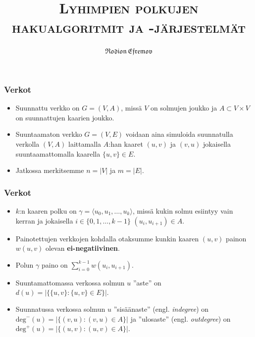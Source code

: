 \documentclass{beamer}
\title{{\rmfamily\scshape Lyhimpien polkujen hakualgoritmit ja -järjestelmät}}
\author{$\mathfrak{Rodion \, Efremov}$}
\date{}
\institute{Tietojenkäsittelytieteen laitos, Helsingin yliopisto}
\begin{document}
\maketitle

\begin{frame}
  \frametitle{Verkot}
  \begin{itemize}
    \item Suunnattu verkko on $G = (V, A)$, missä $V$ on solmujen joukko ja $A \subset V \times V$ on suunnattujen kaarien joukko.

    \item Suuntaamaton verkko $G = (V, E)$ voidaan aina simuloida suunnatulla verkolla $(V, A)$ laittamalla $A$:han kaaret $(u, v)$ ja $(v, u)$ jokaisella suuntaamattomalla kaarella $\{u, v\} \in E$.

    \item Jatkossa merkitsemme $n = |V|$ ja $m = |E|$.
  \end{itemize}
\end{frame}

\begin{frame}
  \frametitle{Verkot}
  \begin{itemize}
    \item $k$:n kaaren polku on $\gamma = \langle u_0, u_1, \dots, u_k \rangle$, missä kukin solmu esiintyy vain kerran ja jokaisella $i \in \{ 0, 1, \dots, k - 1 \}$ $(u_i, u_{i + 1}) \in A$.

    \item Painotettujen verkkojen kohdalla otaksumme kunkin kaaren $(u, v)$ painon $w(u, v)$ olevan \textbf{ei-negatiivinen}.
    
	\item Polun $\gamma$ paino on $\sum_{i = 0}^{k - 1} w(u_i, u_{i + 1})$.
    
    \item Suuntamattomassa verkossa solmun $u$ ''aste'' on $d(u) = |\{ \{u, v\} \colon \{ u, v \} \in E \}|$. 
    
    \item Suunnatussa verkossa solmun $u$ ''sisäänaste'' (engl. \textit{indegree}) on $\textrm{deg}^-(u) = | \{ (v, u) \colon (v, u) \in A \} |$ ja
      ''ulosaste'' (engl. \textit{outdegree}) on $\textrm{deg}^+(u) = | \{ (u, v) \colon (u, v) \in A \} |$.
  \end{itemize}
\end{frame}
\end{document}
